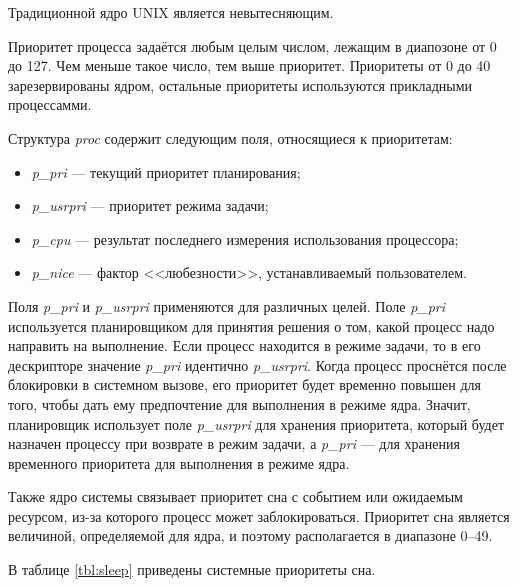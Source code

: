 Традиционной ядро UNIX является невытесняющим.

Приоритет процесса задаётся любым целым числом, лежащим в 
диапозоне от 0 до 127. Чем меньше такое число, тем выше приоритет.
Приоритеты от 0 до 40 зарезервированы ядром, остальные приоритеты 
используются прикладными процессамми.

Структура 	\textit{proc} содержит следующим поля, относящиеся к приоритетам:
\begin{itemize}
	\item 	\textit{p\_pri} --- текущий приоритет планирования;
	\item 	\textit{p\_usrpri} --- приоритет режима задачи;
	\item 	\textit{p\_cpu} --- результат последнего измерения использования процессора;
	\item 	\textit{p\_nice} --- фактор <<любезности>>, устанавливаемый пользователем.
\end{itemize}

Поля 	\textit{p\_pri} и 	\textit{p\_usrpri} применяются для различных целей.
Поле 	\textit{p\_pri} используется планировщиком для принятия решения о том,
какой процесс надо направить на выполнение. Если процесс находится в режиме задачи,
то в его дескрипторе значение 	\textit{p\_pri} идентично 	\textit{p\_usrpri}.
Когда процесс проснётся после
блокировки в системном вызове, его приоритет будет временно повышен для того,
чтобы дать ему предпочтение для выполнения в режиме ядра. Значит,
планировщик использует поле 	\textit{p\_usrpri} для хранения приоритета, который
будет назначен процессу при возврате в режим задачи, а 	\textit{p\_pri} --- для 
хранения временного приоритета для выполнения в режиме ядра.

Также ядро системы связывает приоритет сна с событием или ожидаемым
ресурсом, из-за которого процесс может заблокироваться. Приоритет сна
является величиной, определяемой для ядра, и поэтому располагается в 
диапазоне 0--49. 

В таблице \ref{tbl:sleep} приведены системные приоритеты сна.

